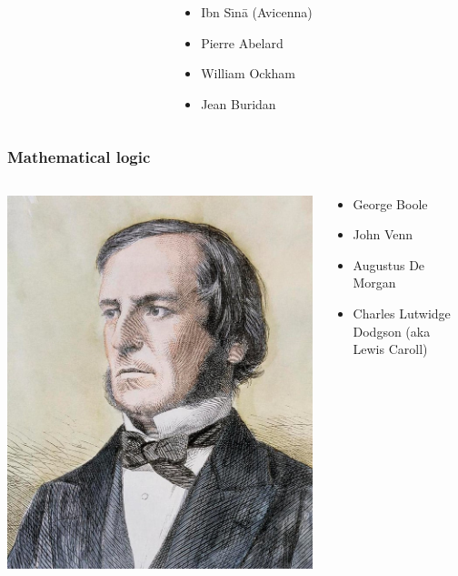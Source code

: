 \begin{frame}
\begin{columns}
\begin{column}{.5\textwidth}
    \end{column}
    \begin{column}{.5\textwidth}
      \begin{itemize}[<+->]
        \item Ibn S\=\i n\=a (Avicenna)
        \item Pierre Abelard
        \item William Ockham
        \item Jean Buridan
      \end{itemize}
    \end{column}
  \end{columns}
\end{frame}

\begin{frame}
  \frametitle{Mathematical logic}

  \begin{columns}
    \begin{column}{.5\textwidth}
    \includegraphics[height=.8\textheight]{../assets/boole}
    \end{column}
    \begin{column}{.5\textwidth}
      \begin{itemize}[<+->]
        \item George Boole
        \item John Venn
        \item Augustus De Morgan
        \item Charles Lutwidge Dodgson (aka Lewis Caroll)
      \end{itemize}
    \end{column}
  \end{columns}
\end{frame}

